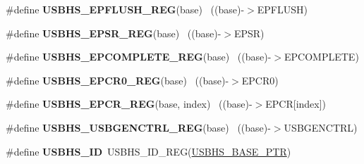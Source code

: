 \begin{DoxyCompactItemize}
\item 
\hypertarget{group___u_s_b_h_s___register___accessor___macros_ga4909b057a36bec7726c44751cb69b284}{}\#define {\bfseries U\+S\+B\+H\+S\+\_\+\+E\+P\+F\+L\+U\+S\+H\+\_\+\+R\+E\+G}(base)                                ~((base)-\/$>$E\+P\+F\+L\+U\+S\+H)\label{group___u_s_b_h_s___register___accessor___macros_ga4909b057a36bec7726c44751cb69b284}

\item 
\hypertarget{group___u_s_b_h_s___register___accessor___macros_gaf3f667dc86ee3c3fc22e6f020bd5ff10}{}\#define {\bfseries U\+S\+B\+H\+S\+\_\+\+E\+P\+S\+R\+\_\+\+R\+E\+G}(base)                                      ~((base)-\/$>$E\+P\+S\+R)\label{group___u_s_b_h_s___register___accessor___macros_gaf3f667dc86ee3c3fc22e6f020bd5ff10}

\item 
\hypertarget{group___u_s_b_h_s___register___accessor___macros_gadaf13d179a3b44962ff8b8d56bfd5294}{}\#define {\bfseries U\+S\+B\+H\+S\+\_\+\+E\+P\+C\+O\+M\+P\+L\+E\+T\+E\+\_\+\+R\+E\+G}(base)                          ~((base)-\/$>$E\+P\+C\+O\+M\+P\+L\+E\+T\+E)\label{group___u_s_b_h_s___register___accessor___macros_gadaf13d179a3b44962ff8b8d56bfd5294}

\item 
\hypertarget{group___u_s_b_h_s___register___accessor___macros_ga589b7cfc20bef407ba1574ea13d8a955}{}\#define {\bfseries U\+S\+B\+H\+S\+\_\+\+E\+P\+C\+R0\+\_\+\+R\+E\+G}(base)                                    ~((base)-\/$>$E\+P\+C\+R0)\label{group___u_s_b_h_s___register___accessor___macros_ga589b7cfc20bef407ba1574ea13d8a955}

\item 
\hypertarget{group___u_s_b_h_s___register___accessor___macros_ga6aa19a762119716b928b564c44a2e345}{}\#define {\bfseries U\+S\+B\+H\+S\+\_\+\+E\+P\+C\+R\+\_\+\+R\+E\+G}(base,  index)                          ~((base)-\/$>$E\+P\+C\+R\mbox{[}index\mbox{]})\label{group___u_s_b_h_s___register___accessor___macros_ga6aa19a762119716b928b564c44a2e345}

\item 
\hypertarget{group___u_s_b_h_s___register___accessor___macros_gaa33a9365813ae6074857e534e2e3b8e8}{}\#define {\bfseries U\+S\+B\+H\+S\+\_\+\+U\+S\+B\+G\+E\+N\+C\+T\+R\+L\+\_\+\+R\+E\+G}(base)                          ~((base)-\/$>$U\+S\+B\+G\+E\+N\+C\+T\+R\+L)\label{group___u_s_b_h_s___register___accessor___macros_gaa33a9365813ae6074857e534e2e3b8e8}

\item 
\hypertarget{group___u_s_b_h_s___register___accessor___macros_ga39294c490f19442aeb68904f1b0eec86}{}\#define {\bfseries U\+S\+B\+H\+S\+\_\+\+I\+D}~U\+S\+B\+H\+S\+\_\+\+I\+D\+\_\+\+R\+E\+G(\hyperlink{group___u_s_b_h_s___peripheral_gaa2bc10b8cd66f96acd39e15b3a581306}{U\+S\+B\+H\+S\+\_\+\+B\+A\+S\+E\+\_\+\+P\+T\+R})\label{group___u_s_b_h_s___register___accessor___macros_ga39294c490f19442aeb68904f1b0eec86}


\end{DoxyCompactItemize}
